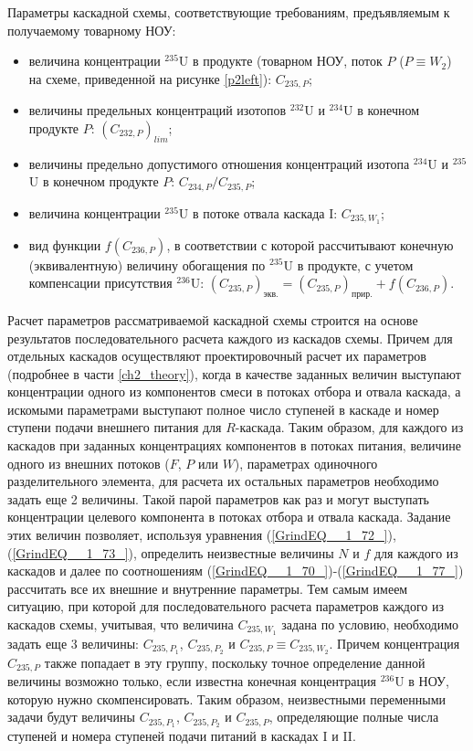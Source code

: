 Параметры каскадной схемы, соответствующие требованиям, предъявляемым к получаемому товарному НОУ:

\begin{itemize}
    \item величина концентрации $^{235}$U в продукте (товарном НОУ, поток $P$ ($P \equiv W_2$) на схеме, приведенной на рисунке \ref{p2left}): $C_{235,{P}}$;
    \item величины предельных концентраций изотопов $^{232}$U и $^{234}$U в конечном продукте $P$: $(C_{232,{P}})_{lim}$;
    \item величины предельно допустимого отношения концентраций изотопа $^{234}$U и $^{235}$U в конечном продукте $P$: ${C_{234,{P}}}/{C_{235,{P}}}$;
    \item величина концентрации $^{235}$U в потоке отвала каскада I: $C_{235,{W_1}}$;
    \item вид функции $f(C_{236,P})$, в соответствии с которой рассчитывают конечную (эквивалентную) величину обогащения по $^{235}$U в продукте, с учетом компенсации присутствия $^{236}$U:
    $(C_{235,P})_\textit{экв.}=(C_{235,P})_\textit{прир.}+f(C_{236,P})$.    
\end{itemize}

Расчет параметров рассматриваемой каскадной схемы строится на основе результатов последовательного расчета каждого из каскадов схемы. Причем для отдельных каскадов осуществляют проектировочный расчет их параметров (подробнее в части \ref{ch2_theory}), когда в качестве заданных величин выступают концентрации одного из компонентов смеси в потоках отбора и отвала каскада, а искомыми параметрами выступают полное число ступеней в каскаде и номер ступени подачи внешнего питания для $R$-каскада. Таким образом, для каждого из каскадов при заданных концентрациях компонентов в потоках питания, величине одного из внешних потоков ($F$, $P$ или $W$), параметрах одиночного разделительного элемента, для расчета их остальных параметров необходимо задать еще 2 величины. Такой парой параметров как раз и могут выступать концентрации целевого компонента в потоках отбора и отвала каскада. Задание этих величин позволяет, используя уравнения (\ref{GrindEQ__1_72_}), (\ref{GrindEQ__1_73_}), определить неизвестные величины $N$ и $f$ для каждого из каскадов и далее по соотношениям (\ref{GrindEQ__1_70_})-(\ref{GrindEQ__1_77_}) рассчитать все их внешние и внутренние параметры. Тем самым имеем ситуацию, при которой для последовательного расчета параметров каждого из каскадов схемы, учитывая, что величина $C_{235,{W_1}}$ задана по условию, необходимо задать еще 3 величины: $C_{235,{P_1}}$, $C_{235,{P_2}}$ и $C_{235,{P}}\equiv C_{235,{W_2}}$. Причем концентрация $C_{235,{P}}$ также попадает в эту группу, поскольку точное определение данной величины возможно только, если известна конечная концентрация $^{236}$U в НОУ, которую нужно скомпенсировать. Таким образом, неизвестными переменными задачи будут величины $C_{235,{P_1}}$, $C_{235,{P_2}}$ и $C_{235,{P}}$, определяющие полные числа ступеней и номера ступеней подачи питаний в каскадах I и II.


